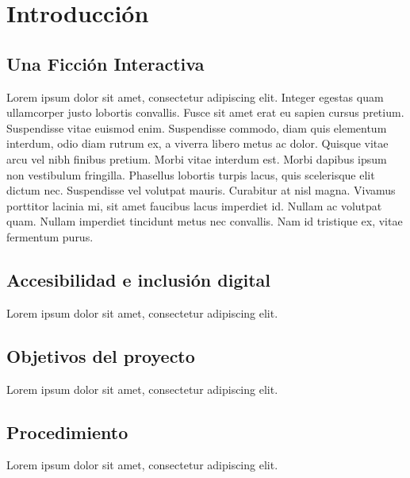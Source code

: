 
\chapter{Introducción}\label{ch:introduccion}

\section{Una Ficción Interactiva}

Lorem ipsum dolor sit amet\cite{Montfort2004}, consectetur adipiscing elit. Integer egestas quam ullamcorper justo lobortis convallis. Fusce sit amet erat eu sapien cursus pretium. Suspendisse vitae euismod enim. Suspendisse commodo, diam quis elementum interdum, odio diam rutrum ex, a viverra libero metus ac dolor. Quisque vitae arcu vel nibh finibus pretium. Morbi vitae interdum est. Morbi dapibus ipsum non vestibulum fringilla. Phasellus lobortis turpis lacus, quis scelerisque elit dictum nec. Suspendisse vel volutpat mauris. Curabitur at nisl magna. Vivamus porttitor lacinia mi, sit amet faucibus lacus imperdiet id. Nullam ac volutpat quam. Nullam imperdiet tincidunt metus nec convallis. Nam id tristique ex, vitae fermentum purus.

\section{Accesibilidad e inclusión digital}

Lorem ipsum\cite{Wilson2002} dolor sit amet, consectetur adipiscing elit.

\section{Objetivos del proyecto}

Lorem ipsum dolor sit amet, consectetur adipiscing elit.

\section{Procedimiento}

Lorem ipsum dolor sit amet, consectetur adipiscing elit.
